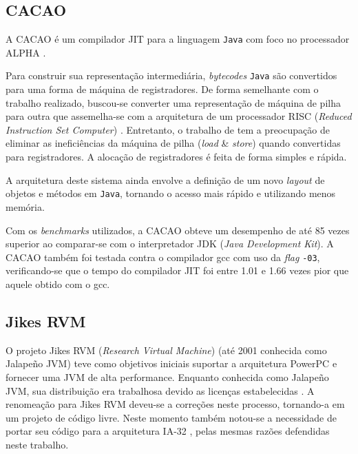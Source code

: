 \subsection{CACAO}

A CACAO \cite{cacao} é um compilador JIT para a linguagem
\texttt{Java} com foco no processador ALPHA \cite{alphaproc}.

Para construir sua representação intermediária, \textit{bytecodes}
\texttt{Java} são convertidos para uma forma de máquina de registradores. De
forma semelhante com o trabalho realizado, buscou-se converter uma
representação de máquina de pilha para outra que assemelha-se com a
arquitetura de um processador RISC (\textit{Reduced Instruction Set
  Computer}) \cite{risc}. Entretanto, o trabalho de  tem a preocupação
de eliminar as ineficiências da máquina de pilha  (\textit{load} \&
\textit{store}) quando convertidas para registradores.
A alocação de registradores é feita de forma simples e rápida.

A arquitetura deste sistema ainda envolve a definição de um novo
\textit{layout} de objetos e métodos em \texttt{Java}, tornando o
acesso mais rápido e utilizando menos memória.

Com os \textit{benchmarks} utilizados, a CACAO obteve um desempenho de
até 85 vezes superior ao comparar-se com o interpretador JDK
(\textit{Java Development Kit}). A CACAO também foi testada
contra o compilador gcc \cite{gcc1} com uso da \textit{flag}
\verb!-03!, verificando-se que o tempo do compilador JIT foi
entre 1.01 e 1.66 vezes pior que aquele obtido com o gcc.



\subsection{Jikes RVM}

O projeto Jikes RVM (\textit{Research Virtual Machine}) \cite{jikes}
(até 2001 conhecida como Jalapeño JVM) teve como objetivos iniciais
suportar a arquitetura PowerPC \cite{powerpc} e fornecer uma JVM de
alta performance. Enquanto conhecida como Jalapeño JVM, sua
distribuição era trabalhosa devido as licenças estabelecidas
\cite{jikesrvm2}. A renomeação para Jikes RVM deveu-se a correções
neste processo, tornando-a em um projeto de código livre. Neste momento
também notou-se a necessidade de portar seu código para a arquitetura
IA-32 \cite{jikesrvm2}, pelas mesmas razões defendidas neste trabalho.

